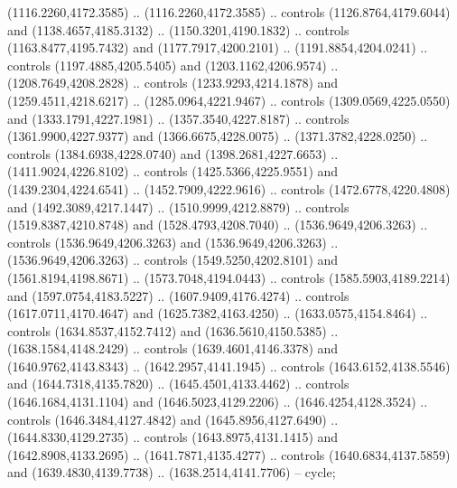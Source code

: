 \begin{scope}[shift={(-343.28256,-575.56596)}]
\begin{scope}[shift={(-736.04956,-3272.8657)}]
      (1116.2260,4172.3585) .. (1116.2260,4172.3585) .. controls
      (1126.8764,4179.6044) and (1138.4657,4185.3132) .. (1150.3201,4190.1832) ..
      controls (1163.8477,4195.7432) and (1177.7917,4200.2101) ..
      (1191.8854,4204.0241) .. controls (1197.4885,4205.5405) and
      (1203.1162,4206.9574) .. (1208.7649,4208.2828) .. controls
      (1233.9293,4214.1878) and (1259.4511,4218.6217) .. (1285.0964,4221.9467) ..
      controls (1309.0569,4225.0550) and (1333.1791,4227.1981) ..
      (1357.3540,4227.8187) .. controls (1361.9900,4227.9377) and
      (1366.6675,4228.0075) .. (1371.3782,4228.0250) .. controls
      (1384.6938,4228.0740) and (1398.2681,4227.6653) .. (1411.9024,4226.8102) ..
      controls (1425.5366,4225.9551) and (1439.2304,4224.6541) ..
      (1452.7909,4222.9616) .. controls (1472.6778,4220.4808) and
      (1492.3089,4217.1447) .. (1510.9999,4212.8879) .. controls
      (1519.8387,4210.8748) and (1528.4793,4208.7040) .. (1536.9649,4206.3263) ..
      controls (1536.9649,4206.3263) and (1536.9649,4206.3263) ..
      (1536.9649,4206.3263) .. controls (1549.5250,4202.8101) and
      (1561.8194,4198.8671) .. (1573.7048,4194.0443) .. controls
      (1585.5903,4189.2214) and (1597.0754,4183.5227) .. (1607.9409,4176.4274) ..
      controls (1617.0711,4170.4647) and (1625.7382,4163.4250) ..
      (1633.0575,4154.8464) .. controls (1634.8537,4152.7412) and
      (1636.5610,4150.5385) .. (1638.1584,4148.2429) .. controls
      (1639.4601,4146.3378) and (1640.9762,4143.8343) .. (1642.2957,4141.1945) ..
      controls (1643.6152,4138.5546) and (1644.7318,4135.7820) ..
      (1645.4501,4133.4462) .. controls (1646.1684,4131.1104) and
      (1646.5023,4129.2206) .. (1646.4254,4128.3524) .. controls
      (1646.3484,4127.4842) and (1645.8956,4127.6490) .. (1644.8330,4129.2735) ..
      controls (1643.8975,4131.1415) and (1642.8908,4133.2695) ..
      (1641.7871,4135.4277) .. controls (1640.6834,4137.5859) and
      (1639.4830,4139.7738) .. (1638.2514,4141.7706) -- cycle;


\end{scope}
\end{scope}
